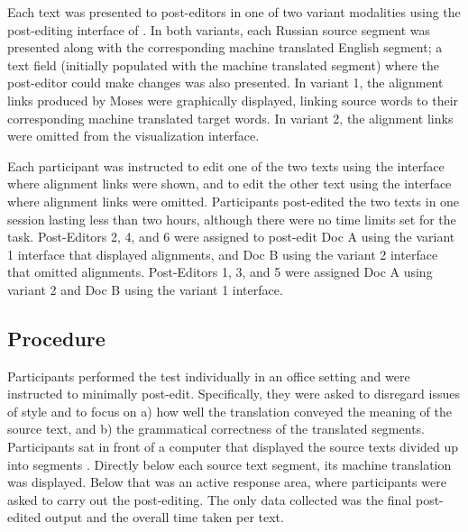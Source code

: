 

Each text was presented to post-editors in one of two variant modalities using the post-editing interface of \citet{2014_WMT_Schwartz_etal}. 
%
In both variants, each Russian source segment was presented along with the corresponding machine translated English segment; a text field (initially populated with the machine translated segment) where the post-editor could make changes was also presented.
%
In variant 1, the alignment links produced by Moses were graphically displayed, linking source words to their corresponding machine translated target words.
%
In variant 2, the alignment links were omitted from the visualization interface.



Each participant was instructed to edit one of the two texts using the interface where alignment links were shown,
%
and to edit the other text using the interface where alignment links were omitted.
%
Participants post-edited the two texts in one session lasting less than two hours, although there were no time limits set for the task.
%
Post-Editors 2, 4, and 6 were assigned to post-edit Doc A using the variant 1 interface that displayed alignments, and Doc B using the variant 2 interface that omitted alignments.
%
Post-Editors 1, 3, and 5 were assigned Doc A using variant 2 and Doc B using the variant 1 interface.





\subsection{Procedure}

Participants performed the test individually in an office setting and were instructed to minimally post-edit. 
%
Specifically, they were asked to disregard issues of style and to focus on 
%
a) how well the translation conveyed the meaning of the source text, and 
%
b) the grammatical correctness of the translated segments. 
%
Participants sat in front of a computer that displayed the source texts divided up into segments \cite[Figure 1]{2014_WMT_Schwartz_etal}. %
%
Directly below each source text segment, its machine translation was displayed.
%
Below that was an active response area, where participants were asked to carry out the post-editing.
%
The only data collected was the final post-edited output and the overall time taken per text.




